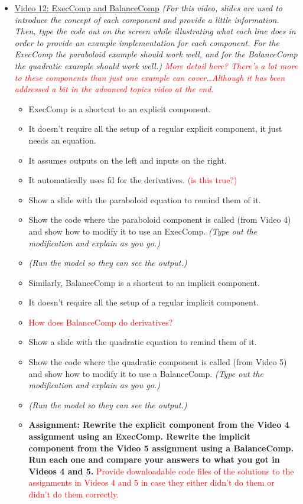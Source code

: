 \documentclass[12pt, letterpaper]{article}
\begin{document}
\begin{itemize}
	\item \underline{Video 12: ExecComp and BalanceComp} \textit{(For this video, slides are used to introduce the concept of each component and provide a little information. Then, type the code out on the screen while illustrating what each line does in order to provide an example implementation for each component. For the ExecComp the paraboloid example should work well, and for the BalanceComp the quadratic example should work well.) \textcolor{red}{More detail here? There’s a lot more to these components than just one example can cover…Although it has been addressed a bit in the advanced topics video at the end.}}
		\begin{itemize}
			\item ExecComp is a shortcut to an explicit component. 
			\item It doesn’t require all the setup of a regular explicit component, it just needs an equation.
			\item It assumes outputs on the left and inputs on the right. 
			\item It automatically uses fd for the derivatives. \textcolor{red}{(is this true?)}
			\item Show a slide with the paraboloid equation to remind them of it.
			\item Show the code where the paraboloid component is called (from Video 4) and show how to modify it to use an ExecComp. \textit{(Type out the modification and explain as you go.)}
			\item \textit{(Run the model so they can see the output.)}
			\item Similarly, BalanceComp is a shortcut to an implicit component.
			\item It doesn’t require all the setup of a regular implicit component.
			\item \textcolor{red}{How does BalanceComp do derivatives?}
			\item Show a slide with the quadratic equation to remind them of it.
			\item Show the code where the quadratic component is called (from Video 5) and show how to modify it to use a BalanceComp. \textit{(Type out the modification and explain as you go.)}
			\item \textit{(Run the model so they can see the output.)}
			\item \textbf{Assignment: Rewrite the explicit component from the Video 4 assignment using an ExecComp. Rewrite the implicit component from the Video 5 assignment using a BalanceComp. Run each one and compare your answers to what you got in Videos 4 and 5.} \textcolor{red}{Provide downloadable code files of the solutions to the assignments in Videos 4 and 5 in case they either didn't do them or didn't do them correctly.}
		\end{itemize}


\end{itemize}
\end{document}
